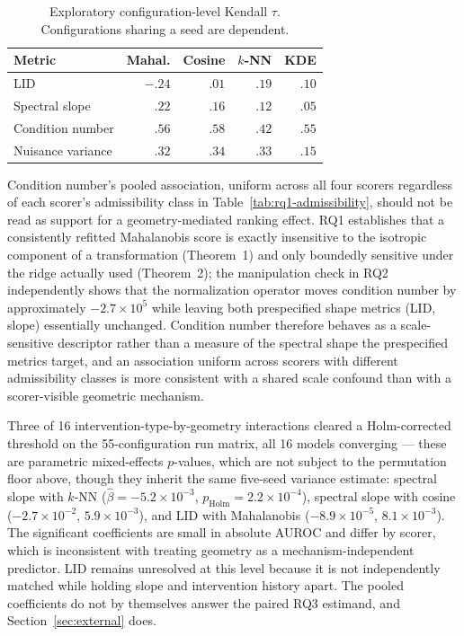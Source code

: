 \documentclass[11pt,a4paper]{article}
\begin{document}
\begin{table}[t]
\centering
\caption{Exploratory configuration-level Kendall $\tau$. Configurations sharing a seed are dependent.}
\label{tab:rq2}
\small
\begin{tabular}{lrrrr}
\toprule
Metric & Mahal. & Cosine & $k$-NN & KDE\\
\midrule
LID & $-.24$ & $.01$ & $.19$ & $.10$\\
Spectral slope & $.22$ & $.16$ & $.12$ & $.05$\\
Condition number & $.56$ & $.58$ & $.42$ & $.55$\\
Nuisance variance & $.32$ & $.34$ & $.33$ & $.15$\\
\bottomrule
\end{tabular}
\end{table}

Condition number's pooled association, uniform across all four scorers regardless of each scorer's admissibility class in Table~\ref{tab:rq1-admissibility}, should not be read as support for a geometry-mediated ranking effect. RQ1 establishes that a consistently refitted Mahalanobis score is exactly insensitive to the isotropic component of a transformation (Theorem~1) and only boundedly sensitive under the ridge actually used (Theorem~2); the manipulation check in RQ2 independently shows that the normalization operator moves condition number by approximately $-2.7\times10^{5}$ while leaving both prespecified shape metrics (LID, slope) essentially unchanged. Condition number therefore behaves as a scale-sensitive descriptor rather than a measure of the spectral shape the prespecified metrics target, and an association uniform across scorers with different admissibility classes is more consistent with a shared scale confound than with a scorer-visible geometric mechanism.

Three of 16 intervention-type-by-geometry interactions cleared a Holm-corrected threshold on the 55-configuration run matrix, all 16 models converging --- these are parametric mixed-effects $p$-values, which are not subject to the permutation floor above, though they inherit the same five-seed variance estimate: spectral slope with $k$-NN ($\hat\beta=-5.2\times10^{-3}$, $p_{\mathrm{Holm}}=2.2\times10^{-4}$), spectral slope with cosine ($-2.7\times10^{-2}$, $5.9\times10^{-3}$), and LID with Mahalanobis ($-8.9\times10^{-5}$, $8.1\times10^{-3}$). The significant coefficients are small in absolute AUROC and differ by scorer, which is inconsistent with treating geometry as a mechanism-independent predictor. LID remains unresolved at this level because it is not independently matched while holding slope and intervention history apart. The pooled coefficients do not by themselves answer the paired RQ3 estimand, and Section~\ref{sec:external} does.
\end{document}

